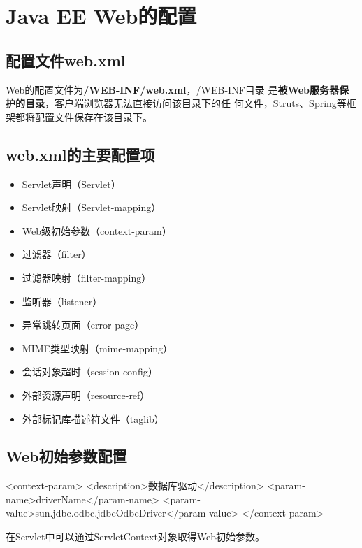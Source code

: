 \section{Java EE Web的配置}

\subsection{配置文件web.xml} 

Web的配置文件为{\bf\Red /WEB-INF/web.xml}，/WEB-INF目录
是{\bf\Red 被Web服务器保护的目录}，客户端浏览器无法直接访问该目录下的任
何文件，Struts、Spring等框架都将配置文件保存在该目录下。

\subsection{web.xml的主要配置项}

\begin{itemize}
\item Servlet声明（Servlet）
\item Servlet映射（Servlet-mapping）    
\item Web级初始参数（context-param）
\item 过滤器（filter）
\item 过滤器映射（filter-mapping）
\item 监听器（listener）
\item 异常跳转页面（error-page）
\item MIME类型映射（mime-mapping）
\item 会话对象超时（session-config）
\item 外部资源声明（resource-ref）
\item 外部标记库描述符文件（taglib）
\end{itemize}

\subsection{Web初始参数配置} 


\begin{xmlCode}
  <context-param>
  <description>数据库驱动</description>
  <param-name>driverName</param-name>
  <param-value>sun.jdbc.odbc.jdbcOdbcDriver</param-value>
  </context-param>
\end{xmlCode}


在Servlet中可以通过ServletContext对象取得Web初始参数。

